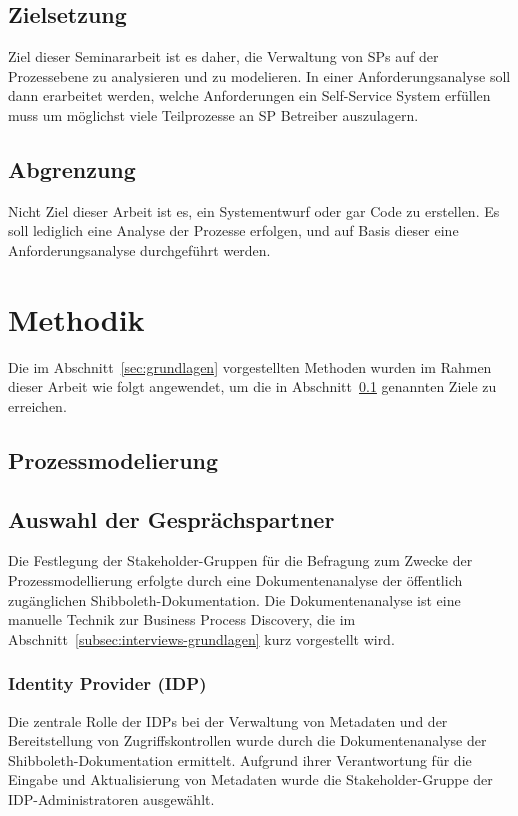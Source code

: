 \documentclass[a4paper, fontsize=11pt]{scrartcl}
\begin{document}
\subsection{Zielsetzung}\label{subsec:zielsetzung}
Ziel dieser Seminararbeit ist es daher, die Verwaltung von SPs auf der Prozessebene zu analysieren und zu modelieren.
In einer Anforderungsanalyse soll dann erarbeitet werden, welche Anforderungen ein Self-Service System erfüllen muss um möglichst viele Teilprozesse an SP Betreiber auszulagern.
\subsection{Abgrenzung}\label{subsec:abgrenzung}
Nicht Ziel dieser Arbeit ist es, ein Systementwurf oder gar Code zu erstellen.
Es soll lediglich eine Analyse der Prozesse erfolgen, und auf Basis dieser eine Anforderungsanalyse durchgeführt werden.




\section{Methodik}\label{sec:methodik}
Die im Abschnitt~\ref{sec:grundlagen} vorgestellten Methoden wurden im Rahmen dieser Arbeit wie folgt angewendet, um die in Abschnitt~\ref{subsec:zielsetzung} genannten Ziele zu erreichen.
\subsection{Prozessmodelierung}\label{subsec:prozessmodelierung-methodik}
\subsection{Auswahl der Gesprächspartner}\label{subsubsec:auswahl-gespraechspartner}
Die Festlegung der Stakeholder-Gruppen für die Befragung zum Zwecke der Prozessmodellierung erfolgte durch eine Dokumentenanalyse der öffentlich zugänglichen Shibboleth-Dokumentation. 
Die Dokumentenanalyse ist eine manuelle Technik zur Business Process Discovery, die im Abschnitt~\ref{subsec:interviews-grundlagen} kurz vorgestellt wird. 

\subsubsection{Identity Provider (IDP)}
Die zentrale Rolle der IDPs bei der Verwaltung von Metadaten und der Bereitstellung von Zugriffskontrollen wurde durch die Dokumentenanalyse der Shibboleth-Dokumentation ermittelt. 
Aufgrund ihrer Verantwortung für die Eingabe und Aktualisierung von Metadaten wurde die Stakeholder-Gruppe der IDP-Administratoren ausgewählt.
\end{document}
